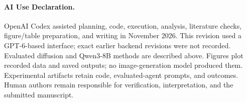 \documentclass[runningheads,orivec]{llncs}
\begin{document}
\paragraph{AI Use Declaration.} OpenAI Codex assisted planning, code, execution, analysis, literature checks, figure/table preparation, and writing in November 2026. This revision used a GPT-6-based interface; exact earlier backend revisions were not recorded. Evaluated diffusion and Qwen3-8B methods are described above. Figures plot recorded data and saved outputs; no image-generation model produced them. Experimental artifacts retain code, evaluated-agent prompts, and outcomes. Human authors remain responsible for verification, interpretation, and the submitted manuscript.



\end{document}
